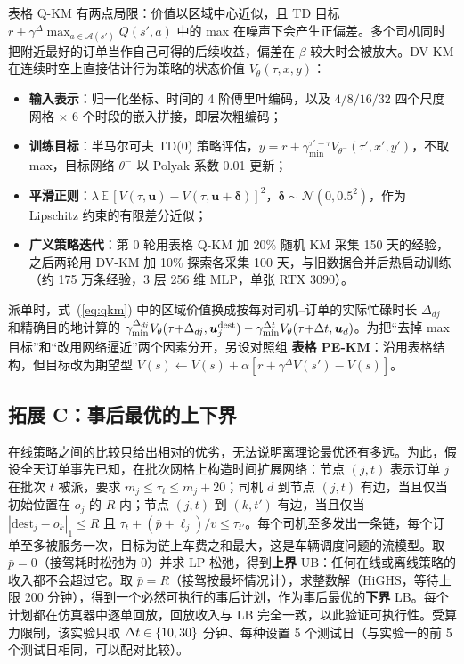 表格 Q-KM 有两点局限：价值以区域中心近似，且 TD 目标 $r+\gamma^{\Delta}\max_{a\in\mathcal{A}(s')}Q(s',a)$ 中的 max 在噪声下会产生正偏差\cite{hasselt2010double}。多个司机同时把附近最好的订单当作自己可得的后续收益，偏差在 $\beta$ 较大时会被放大。DV-KM 在连续时空上直接估计行为策略的状态价值 $V_\theta(\tau,x,y)$：
\begin{itemize}
	\item \textbf{输入表示}：归一化坐标、时间的 4 阶傅里叶编码，以及 $4/8/16/32$ 四个尺度网格 × 6 个时段的嵌入拼接，即层次粗编码\cite{tang2019deep}；
	\item \textbf{训练目标}：半马尔可夫 TD(0) 策略评估，$y=r+\gamma_{\min}^{\tau'-\tau}V_{\theta^-}(\tau',x',y')$，不取 max，目标网络 $\theta^-$ 以 Polyak 系数 0.01 更新；
	\item \textbf{平滑正则}：$\lambda\,\mathbb{E}\,[V(\tau,\bm{u})-V(\tau,\bm{u}+\bm\delta)]^2$，$\bm\delta\sim\mathcal{N}(0,0.5^2)$，作为 Lipschitz 约束的有限差分近似；
	\item \textbf{广义策略迭代}：第 0 轮用表格 Q-KM 加 20\% 随机 KM 采集 150 天的经验，之后两轮用 DV-KM 加 10\% 探索各采集 100 天，与旧数据合并后热启动训练（约 175 万条经验，3 层 256 维 MLP，单张 RTX 3090）。
\end{itemize}
派单时，式~(\ref{eq:qkm}) 中的区域价值换成按每对司机–订单的实际忙碌时长 $\Delta_{dj}$ 和精确目的地计算的 $\gamma_{\min}^{\Delta_{dj}}V_\theta(\tau{+}\Delta_{dj},\bm{u}^{\text{dest}}_j)-\gamma_{\min}^{\Delta t}V_\theta(\tau{+}\Delta t,\bm{u}_d)$。为把“去掉 max 目标”和“改用网络逼近”两个因素分开，另设对照组 \textbf{表格 PE-KM}：沿用表格结构，但目标改为期望型 $V(s)\leftarrow V(s)+\alpha[r+\gamma^{\Delta}V(s')-V(s)]$。

\subsection{拓展 C：事后最优的上下界}\label{sec:hindsight}

在线策略之间的比较只给出相对的优劣，无法说明离理论最优还有多远。为此，假设全天订单事先已知，在批次网格上构造时间扩展网络：节点 $(j,t)$ 表示订单 $j$ 在批次 $t$ 被派，要求 $m_j\le\tau_t\le m_j+20$；司机 $d$ 到节点 $(j,t)$ 有边，当且仅当初始位置在 $o_j$ 的 $R$ 内；节点 $(j,t)$ 到 $(k,t')$ 有边，当且仅当 $|\text{dest}_j-o_k|_1\le R$ 且 $\tau_t+(\bar p+\ell_j)/v\le\tau_{t'}$。每个司机至多发出一条链，每个订单至多被服务一次，目标为链上车费之和最大，这是车辆调度问题的流模型\cite{bunte2009overview}。取 $\bar p=0$（接驾耗时松弛为 0）并求 LP 松弛，得到\textbf{上界} UB：任何在线或离线策略的收入都不会超过它。取 $\bar p=R$（接驾按最坏情况计），求整数解（HiGHS，等待上限 200 分钟），得到一个必然可执行的事后计划，作为事后最优的\textbf{下界} LB。每个计划都在仿真器中逐单回放，回放收入与 LB 完全一致，以此验证可执行性。受算力限制，该实验只取 $\Delta t\in\{10,30\}$ 分钟、每种设置 5 个测试日（与实验一的前 5 个测试日相同，可以配对比较）。

